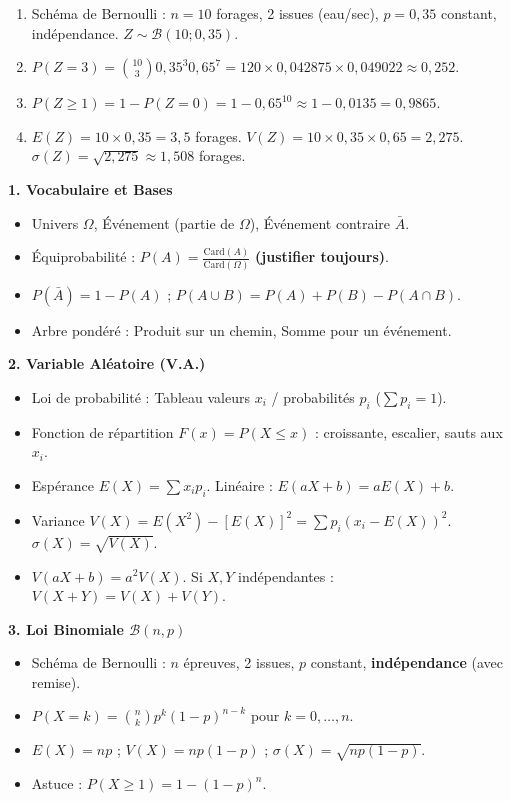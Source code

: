 \documentclass[11pt]{article}
\newcommand{\cle}[1]{{\popxbold\color{popdark}#1}}
\begin{document}
\begin{corrige}
\begin{enumerate}
    \item Schéma de Bernoulli : $n=10$ forages, 2 issues (eau/sec), $p=0,35$ constant, indépendance. $Z \sim \mathcal{B}(10; 0,35)$.
    \item $P(Z=3) = \binom{10}{3} 0,35^3 0,65^7 = 120 \times 0,042875 \times 0,049022 \approx 0,252$.
    \item $P(Z \ge 1) = 1 - P(Z=0) = 1 - 0,65^{10} \approx 1 - 0,0135 = 0,9865$.
    \item $E(Z) = 10 \times 0,35 = 3,5$ forages.
    $V(Z) = 10 \times 0,35 \times 0,65 = 2,275$.
    $\sigma(Z) = \sqrt{2,275} \approx 1,508$ forages.
\end{enumerate}
\end{corrige}

\begin{bilan}

\textbf{1. Vocabulaire et Bases}
\begin{itemize}
    \item \cle{Univers $\Omega$}, \cle{Événement} (partie de $\Omega$), \cle{Événement contraire $\bar{A}$}.
    \item \cle{Équiprobabilité} : $P(A) = \frac{\mathrm{Card}(A)}{\mathrm{Card}(\Omega)}$ \textbf{(justifier toujours)}.
    \item $P(\bar{A}) = 1 - P(A)$ ; $P(A \cup B) = P(A) + P(B) - P(A \cap B)$.
    \item \cle{Arbre pondéré} : Produit sur un chemin, Somme pour un événement.
\end{itemize}

\textbf{2. Variable Aléatoire (V.A.)}
\begin{itemize}
    \item \cle{Loi de probabilité} : Tableau valeurs $x_i$ / probabilités $p_i$ ($\sum p_i = 1$).
    \item \cle{Fonction de répartition} $F(x) = P(X \le x)$ : croissante, escalier, sauts aux $x_i$.
    \item \cle{Espérance} $E(X) = \sum x_i p_i$. Linéaire : $E(aX+b)=aE(X)+b$.
    \item \cle{Variance} $V(X) = E(X^2) - [E(X)]^2 = \sum p_i(x_i-E(X))^2$. $\sigma(X)=\sqrt{V(X)}$.
    \item $V(aX+b) = a^2 V(X)$. Si $X,Y$ indépendantes : $V(X+Y)=V(X)+V(Y)$.
\end{itemize}

\textbf{3. Loi Binomiale $\mathcal{B}(n,p)$}
\begin{itemize}
    \item \cle{Schéma de Bernoulli} : $n$ épreuves, 2 issues, $p$ constant, \textbf{indépendance} (avec remise).
    \item $P(X=k) = \binom{n}{k} p^k (1-p)^{n-k}$ pour $k=0,\dots,n$.
    \item $E(X) = np$ ; $V(X) = np(1-p)$ ; $\sigma(X) = \sqrt{np(1-p)}$.
    \item Astuce : $P(X \ge 1) = 1 - (1-p)^n$.
\end{itemize}

\end{bilan}
\end{document}
